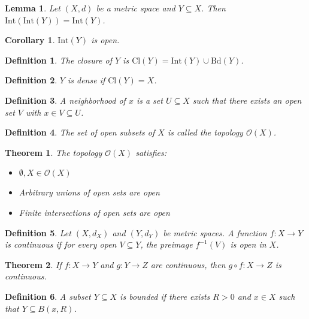 \documentclass{article}
\newtheorem{theorem}{Theorem}
\newtheorem{definition}{Definition}
\newtheorem{lemma}{Lemma}
\newtheorem{corollary}{Corollary}
\begin{document}
\begin{lemma}
Let $(X, d)$ be a metric space and $Y \subseteq X$. Then $\mathrm{Int}(\mathrm{Int}(Y)) = \mathrm{Int}(Y)$.
\end{lemma}

\begin{corollary}
$\mathrm{Int}(Y)$ is open.
\end{corollary}

\begin{definition}
The \emph{closure} of $Y$ is $\mathrm{Cl}(Y) = \mathrm{Int}(Y) \cup \mathrm{Bd}(Y)$.
\end{definition}

\begin{definition}
$Y$ is \emph{dense} if $\mathrm{Cl}(Y) = X$.
\end{definition}

\begin{definition}
A \emph{neighborhood} of $x$ is a set $U \subseteq X$ such that there exists an open set $V$ with $x \in V \subseteq U$.
\end{definition}

\begin{definition}
The set of open subsets of $X$ is called the \emph{topology} $\mathcal{O}(X)$.
\end{definition}

\begin{theorem}
The topology $\mathcal{O}(X)$ satisfies:
\begin{itemize}
  \item $\emptyset, X \in \mathcal{O}(X)$
  \item Arbitrary unions of open sets are open
  \item Finite intersections of open sets are open
\end{itemize}
\end{theorem}

\begin{definition}
Let $(X, d_X)$ and $(Y, d_Y)$ be metric spaces. A function $f: X \to Y$ is \emph{continuous} if for every open $V \subseteq Y$, the preimage $f^{-1}(V)$ is open in $X$.
\end{definition}

\begin{theorem}
If $f: X \to Y$ and $g: Y \to Z$ are continuous, then $g \circ f: X \to Z$ is continuous.
\end{theorem}

\begin{definition}
A subset $Y \subseteq X$ is \emph{bounded} if there exists $R > 0$ and $x \in X$ such that $Y \subseteq B(x, R)$.
\end{definition}
\end{document}
